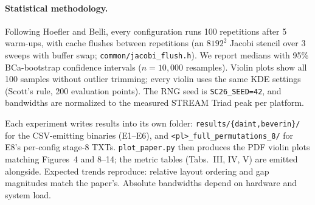 \documentclass[conference]{IEEEtran}
\begin{document}
\paragraph{Statistical methodology.} Following Hoefler and Belli, every configuration runs 100 repetitions after 5 warm-ups, with cache flushes between repetitions (an $8192^2$ Jacobi stencil over 3 sweeps with buffer swap; \texttt{common/jacobi\_flush.h}). We report medians with 95\% BCa-bootstrap confidence intervals ($n=10{,}000$ resamples). Violin plots show all 100 samples without outlier trimming; every violin uses the same KDE settings (Scott's rule, 200 evaluation points). The RNG seed is \texttt{SC26\_SEED=42}, and bandwidths are normalized to the measured STREAM Triad peak per platform.

\artout

Each experiment writes results into its own folder: \texttt{results/\{daint,beverin\}/} for the CSV-emitting binaries (E1--E6), and \texttt{<pl>\_full\_permutations\_8/} for E8's per-config stage-8 TXTs. \texttt{plot\_paper.py} then produces the PDF violin plots matching Figures~4 and 8--14; the metric tables (Tabs.~III, IV, V) are emitted alongside. Expected trends reproduce: relative layout ordering and gap magnitudes match the paper's. Absolute bandwidths depend on hardware and system load.
\end{document}
